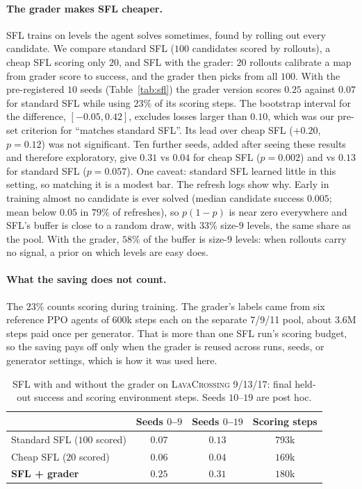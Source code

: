 \documentclass[twoside]{article}
\begin{document}
\paragraph{The grader makes SFL cheaper.} SFL \citep{rutherford2024no} trains on levels the agent solves sometimes, found by rolling out every candidate. We compare standard SFL ($100$ candidates scored by rollouts), a cheap SFL scoring only $20$, and SFL with the grader: $20$ rollouts calibrate a map from grader score to success, and the grader then picks from all $100$. With the pre-registered $10$ seeds (Table~\ref{tab:sfl}) the grader version scores $0.25$ against $0.07$ for standard SFL while using $23\%$ of its scoring steps. The bootstrap interval for the difference, $[-0.05, 0.42]$, excludes losses larger than $0.10$, which was our pre-set criterion for ``matches standard SFL''. Its lead over cheap SFL ($+0.20$, $p=0.12$) was not significant. Ten further seeds, added after seeing these results and therefore exploratory, give $0.31$ vs $0.04$ for cheap SFL ($p=0.002$) and vs $0.13$ for standard SFL ($p=0.057$). One caveat: standard SFL learned little in this setting, so matching it is a modest bar. The refresh logs show why. Early in training almost no candidate is ever solved (median candidate success $0.005$; mean below $0.05$ in $79\%$ of refreshes), so $p(1-p)$ is near zero everywhere and SFL's buffer is close to a random draw, with $33\%$ size-$9$ levels, the same share as the pool. With the grader, $58\%$ of the buffer is size-$9$ levels: when rollouts carry no signal, a prior on which levels are easy does.

\paragraph{What the saving does not count.} The $23\%$ counts scoring during training. The grader's labels came from six reference PPO agents of $600$k steps each on the separate 7/9/11 pool, about $3.6$M steps paid once per generator. That is more than one SFL run's scoring budget, so the saving pays off only when the grader is reused across runs, seeds, or generator settings, which is how it was used here.

\begin{table}[t]
\centering
\small
\caption{SFL with and without the grader on \textsc{LavaCrossing} 9/13/17: final held-out success and scoring environment steps. Seeds $10$--$19$ are post hoc.}
\label{tab:sfl}
\label{tab:curriculum-cost}
\setlength{\tabcolsep}{3pt}
\begin{tabular}{lccc}
\toprule
 & Seeds $0$--$9$ & Seeds $0$--$19$ & Scoring steps \\
\midrule
Standard SFL ($100$ scored) & $0.07$ & $0.13$ & $793$k \\
Cheap SFL ($20$ scored) & $0.06$ & $0.04$ & $169$k \\
\textbf{SFL + grader} & $\mathbf{0.25}$ & $\mathbf{0.31}$ & $180$k \\
\bottomrule
\end{tabular}
\end{table}
\end{document}
